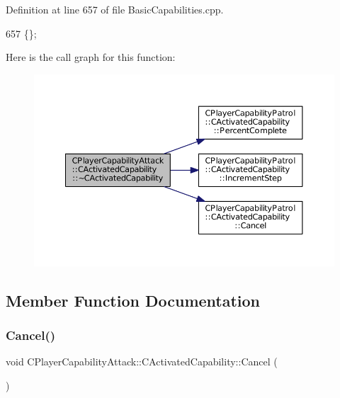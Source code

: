 Definition at line 657 of file Basic\+Capabilities.\+cpp.


\begin{DoxyCode}
657 \{\};
\end{DoxyCode}
Here is the call graph for this function\+:
\nopagebreak
\begin{figure}[H]
\begin{center}
\leavevmode
\includegraphics[width=350pt]{classCPlayerCapabilityAttack_1_1CActivatedCapability_a8524b57d63ce6e899630ef56326be98b_cgraph}
\end{center}
\end{figure}


\subsection{Member Function Documentation}
\hypertarget{classCPlayerCapabilityAttack_1_1CActivatedCapability_a0796fbda8a35b60a2320becfdf2b5c13}{}\label{classCPlayerCapabilityAttack_1_1CActivatedCapability_a0796fbda8a35b60a2320becfdf2b5c13} 
\subsubsection{\texorpdfstring{Cancel()}{Cancel()}}
{\footnotesize\ttfamily void C\+Player\+Capability\+Attack\+::\+C\+Activated\+Capability\+::\+Cancel (\begin{DoxyParamCaption}{ }\end{DoxyParamCaption})\hspace{0.3cm}{\ttfamily [virtual]}}



